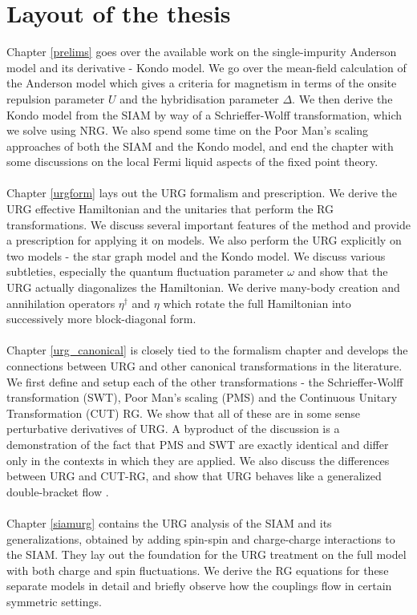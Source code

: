 \documentclass[twoside,11pt]{report}
\numberwithin{equation}{section}
\begin{document}
\section{Layout of the thesis}
Chapter \ref{prelims} goes over the available work on the single-impurity Anderson model and its derivative - Kondo model. We go over the mean-field calculation of the Anderson model which gives a criteria for magnetism in terms of the onsite repulsion parameter \(U\) and the hybridisation parameter \(\Delta\). We then derive the Kondo model from the SIAM by way of a Schrieffer-Wolff transformation, which we solve using NRG. We also spend some time on the Poor Man's scaling approaches of both the SIAM and the Kondo model, and end the chapter with some discussions on the local Fermi liquid aspects of the fixed point theory.
\\\\ Chapter \ref{urgform} lays out the URG formalism and prescription. We derive the URG effective Hamiltonian and the unitaries that perform the RG transformations. We discuss several important features of the method and provide a prescription for applying it on models. We also perform the URG explicitly on two models - the star graph model and the Kondo model. We discuss various subtleties, especially the quantum fluctuation parameter \(\omega\) and show that the URG actually diagonalizes the Hamiltonian. We derive many-body creation and annihilation operators \(\eta^\dagger\) and \(\eta\) which rotate the full Hamiltonian into successively more block-diagonal form.
\\\\ Chapter \ref{urg_canonical} is closely tied to the formalism chapter and develops the connections between URG and other canonical transformations in the literature. We first define and setup each of the other transformations - the Schrieffer-Wolff transformation (SWT), Poor Man's scaling (PMS) and the Continuous Unitary Transformation (CUT) RG. We show that all of these are in some sense perturbative derivatives of URG. A byproduct of the discussion is a demonstration of the fact that PMS and SWT are exactly identical and differ only in the contexts in which they are applied. We also discuss the differences between URG and CUT-RG, and show that URG behaves like a generalized double-bracket flow \cite{Brockett1991}.
\\\\ Chapter \ref{siamurg} contains the URG analysis of the SIAM and its generalizations, obtained by adding spin-spin and charge-charge interactions to the SIAM. They lay out the foundation for the URG treatment on the full model with both charge and spin fluctuations. We derive the RG equations for these separate models in detail and briefly observe how the couplings flow in certain symmetric settings. 
\end{document}
